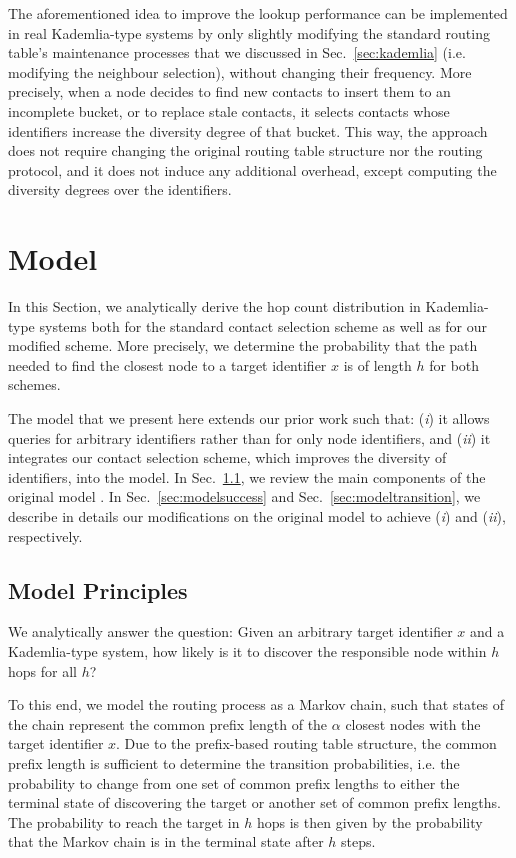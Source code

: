 \documentclass[10pt, conference, compsocconf, letterpaper]{IEEEtran}
\begin{document}
The aforementioned idea to improve the lookup performance can be implemented in real Kademlia-type systems by only slightly modifying the standard routing table's maintenance processes that we discussed in Sec.~\ref{sec:kademlia} (i.e. modifying the neighbour selection), without changing their frequency. More precisely, when a node decides to find new contacts to insert them to an incomplete bucket, or to replace stale contacts, it selects contacts whose identifiers increase the  diversity degree of that bucket. This way, the approach does not require changing the original routing table structure nor the routing protocol, and it does not induce any additional overhead, except computing the diversity degrees over the identifiers. 



\section{Model} \label{sec:model}

In this Section, we analytically derive the hop count distribution in Kademlia-type systems
both for the standard contact selection scheme as well as for our modified scheme. More precisely, we determine the probability that the path needed to find the closest node to a target identifier $x$ is of length $h$ for both schemes. 

The model that we present here extends our prior work \cite{roos13comprehending} such that:  (\emph{i}) it allows queries for arbitrary identifiers rather than for only node identifiers, and (\emph{ii}) it integrates our contact selection scheme, which improves the diversity of identifiers, into the model. In Sec.~\ref{sec:modelreview}, we review the main components of the original model \cite{roos13comprehending}. In Sec.~\ref{sec:modelsuccess} and Sec.~\ref{sec:modeltransition}, we describe in details our modifications on the original model to achieve (\emph{i}) and (\emph{ii}), respectively.

\subsection{Model Principles} \label{sec:modelreview}
We analytically answer the question:
Given an arbitrary target identifier $x$ and a Kademlia-type system, how likely is it
to discover the responsible node within $h$ hops for all $h$?

To this end, we model the routing process as a Markov chain, such that states of the chain represent the 
common prefix length of the $\alpha$ closest nodes with the target identifier $x$. 
Due to the prefix-based routing table structure, the common prefix length is sufficient
to determine the transition probabilities, i.e. the probability to change
from one set of common prefix lengths to either the terminal state of discovering the target or 
another set of  common prefix lengths.
The probability to reach the target in $h$ hops is then given by the probability that
the Markov chain is in the terminal state after $h$ steps.
\end{document}
